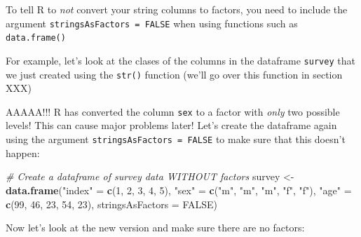 \documentclass[]{book}
\newenvironment{Shaded}{\begin{snugshade}}{\end{snugshade}}
\newcommand{\KeywordTok}[1]{\textcolor[rgb]{0.13,0.29,0.53}{\textbf{{#1}}}}
\newcommand{\DataTypeTok}[1]{\textcolor[rgb]{0.13,0.29,0.53}{{#1}}}
\newcommand{\DecValTok}[1]{\textcolor[rgb]{0.00,0.00,0.81}{{#1}}}
\newcommand{\StringTok}[1]{\textcolor[rgb]{0.31,0.60,0.02}{{#1}}}
\newcommand{\CommentTok}[1]{\textcolor[rgb]{0.56,0.35,0.01}{\textit{{#1}}}}
\newcommand{\OtherTok}[1]{\textcolor[rgb]{0.56,0.35,0.01}{{#1}}}
\newcommand{\NormalTok}[1]{{#1}}
\theoremstyle{definition}
\theoremstyle{definition}
\theoremstyle{remark}
\begin{document}
To tell R to \emph{not} convert your string columns to factors, you need
to include the argument \texttt{stringsAsFactors\ =\ FALSE} when using
functions such as \texttt{data.frame()}

For example, let's look at the clases of the columns in the dataframe
\texttt{survey} that we just created using the \texttt{str()} function
(we'll go over this function in section XXX)

\begin{Shaded}
\end{Shaded}

AAAAA!!! R has converted the column \texttt{sex} to a factor with
\emph{only} two possible levels! This can cause major problems later!
Let's create the dataframe again using the argument
\texttt{stringsAsFactors\ =\ FALSE} to make sure that this doesn't
happen:

\begin{Shaded}
\begin{Highlighting}[]
\CommentTok{# Create a dataframe of survey data WITHOUT factors}
\NormalTok{survey <-}\StringTok{ }\KeywordTok{data.frame}\NormalTok{(}\StringTok{"index"} \NormalTok{=}\StringTok{ }\KeywordTok{c}\NormalTok{(}\DecValTok{1}\NormalTok{, }\DecValTok{2}\NormalTok{, }\DecValTok{3}\NormalTok{, }\DecValTok{4}\NormalTok{, }\DecValTok{5}\NormalTok{),}
                     \StringTok{"sex"} \NormalTok{=}\StringTok{ }\KeywordTok{c}\NormalTok{(}\StringTok{"m"}\NormalTok{, }\StringTok{"m"}\NormalTok{, }\StringTok{"m"}\NormalTok{, }\StringTok{"f"}\NormalTok{, }\StringTok{"f"}\NormalTok{),}
                     \StringTok{"age"} \NormalTok{=}\StringTok{ }\KeywordTok{c}\NormalTok{(}\DecValTok{99}\NormalTok{, }\DecValTok{46}\NormalTok{, }\DecValTok{23}\NormalTok{, }\DecValTok{54}\NormalTok{, }\DecValTok{23}\NormalTok{),}
                     \DataTypeTok{stringsAsFactors =} \OtherTok{FALSE}\NormalTok{)}
\end{Highlighting}
\end{Shaded}

Now let's look at the new version and make sure there are no factors:
\end{document}
